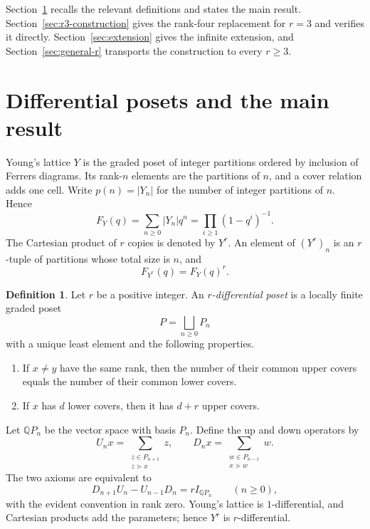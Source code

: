 \documentclass[11pt,a4paper]{amsart}
\theoremstyle{definition}
\newtheorem{definition}[theorem]{Definition}
\theoremstyle{remark}
\newcommand{\card}[1]{\lvert #1\rvert}
\begin{document}
Section~\ref{sec:preliminaries} recalls the relevant definitions and states the main result. Section~\ref{sec:r3-construction} gives the rank-four replacement for $r=3$ and verifies it directly. Section~\ref{sec:extension} gives the infinite extension, and Section~\ref{sec:general-r} transports the construction to every $r\geq3$.

\section{Differential posets and the main result}\label{sec:preliminaries}

Young's lattice $Y$ is the graded poset of integer partitions ordered by inclusion of Ferrers diagrams. Its rank-$n$ elements are the partitions of $n$, and a cover relation adds one cell. Write $p(n)=\card{Y_n}$ for the number of integer partitions of $n$. Hence
\[
  F_Y(q)=\sum_{n\geq0}\card{Y_n}q^n
  =\prod_{i\geq1}(1-q^i)^{-1}.
\]
The Cartesian product of $r$ copies is denoted by $Y^r$. An element of $(Y^r)_n$ is an $r$-tuple of partitions whose total size is $n$, and
\[
  F_{Y^r}(q)=F_Y(q)^r.
\]

\begin{definition}\label{def:differential-poset}
Let $r$ be a positive integer. An \emph{$r$-differential poset} is a locally finite graded poset
\[
  P=\bigsqcup_{n\geq0}P_n
\]
with a unique least element and the following properties.
\begin{enumerate}
  \item[\textup{(D1)}] If $x\neq y$ have the same rank, then the number of their common upper covers equals the number of their common lower covers.
  \item[\textup{(D2)}] If $x$ has $d$ lower covers, then it has $d+r$ upper covers.
\end{enumerate}
\end{definition}

Let $\mathbb{Q}P_n$ be the vector space with basis $P_n$. Define the up and down operators by
\[
  U_nx=\sum_{\substack{z\in P_{n+1}\\z\gtrdot x}}z,
  \qquad
  D_nx=\sum_{\substack{w\in P_{n-1}\\x\gtrdot w}}w.
\]
The two axioms are equivalent to
\begin{equation}\label{eq:differential-identity}
  D_{n+1}U_n-U_{n-1}D_n=rI_{\mathbb{Q}P_n}
  \qquad(n\geq0),
\end{equation}
with the evident convention in rank zero. Young's lattice is $1$-differential, and Cartesian products add the parameters; hence $Y^r$ is $r$-differential.
\end{document}
